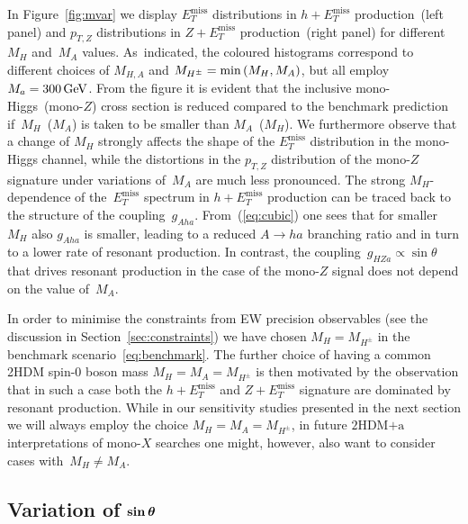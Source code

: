 \documentclass[a4paper, 11pt,notoc]{article}
\newcommand{\MET}{\ensuremath{E_T^\mathrm{miss}}\xspace}
\newcommand{\mA}{\ensuremath{M_{A}}\xspace}
\newcommand{\mH}{\ensuremath{M_{H}}\xspace}
\newcommand{\mHc}{\ensuremath{M_{H^{\pm}}}\xspace}
\newcommand{\hdma}{\ensuremath{\textrm{2HDM+a}}\xspace}
\def\bm#1{\mbox{\boldmath$#1$\unboldmath}}
\begin{document}
In Figure~\ref{fig:mvar} we display $\MET$ distributions in $h + \MET$ production~(left panel) and $p_{T,Z}$ distributions in $Z+\MET$ production~(right panel) for different~$\mH$ and~$\mA$ values. As~indicated, the coloured histograms correspond to  different choices of $M_{H,A}$ and $\mHc = {\rm min} \left ( \mH, \mA \right )$, but all employ $M_a = 300 \, {\rm GeV}$. From the figure it is evident that the inclusive mono-Higgs~(mono-$Z$) cross section is reduced compared to the benchmark prediction if~$\mH$~($\mA$) is taken to be smaller than $\mA$~($\mH$).  We furthermore observe that  a change of $\mH$ strongly affects the shape of the $\MET$ distribution in the mono-Higgs channel, while the distortions in the $p_{T,Z}$ distribution of the mono-$Z$ signature under variations of~$\mA$ are much less pronounced. The strong $M_H$-dependence of the~$\MET$ spectrum in $h + \MET$ production can be traced back to the structure of the coupling~$g_{Aha}$. From~(\ref{eq:cubic}) one sees that for smaller~$M_H$ also $g_{Aha}$ is smaller, leading to a reduced $A \to ha$ branching ratio  and in turn to a lower rate of resonant production.  In contrast, the coupling~$g_{HZa} \propto \sin \theta$ that drives resonant production in the case of the mono-$Z$ signal does not depend on the value of~$M_A$.

In order to minimise the constraints from EW precision observables (see the discussion in Section~\ref{sec:constraints}) we have chosen $\mH = \mHc$ in the  benchmark scenario~\eqref{eq:benchmark}. The further choice of having a common 2HDM  spin-0 boson  mass $\mH = \mA = \mHc$ is then motivated by the observation that in such a case  both the $h + \MET$ and $Z + \MET$ signature are dominated by resonant production. While in our sensitivity studies presented in the next section we will always employ the choice $\mH = \mA = \mHc$, in future \hdma  interpretations of mono-$X$ searches one might, however,  also want to consider cases with~$\mH \neq \mA$. 

\subsection{Variation of $\bm{\sin \theta}$}
\end{document}
